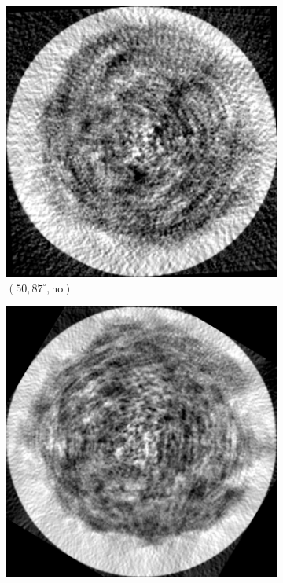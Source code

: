 \documentclass[a4paper, landscape]{article}
\begin{document}
\begin{figure}[H]
	\centering
	\begin{subfigure}{0.13\linewidth}
		\centering
		\includegraphics[width=\linewidth]{results/cryoem, N = 50 and rotated by angle = 87.png}
		\caption{$(50, 87^\circ, \text{no})$}
	\end{subfigure}
	\begin{subfigure}{0.13\linewidth}
		\centering
		\includegraphics[width=\linewidth]{results/cryoem, N = 100 and rotated by angle = 31.png}

\end{subfigure}
\end{figure}
\end{document}

